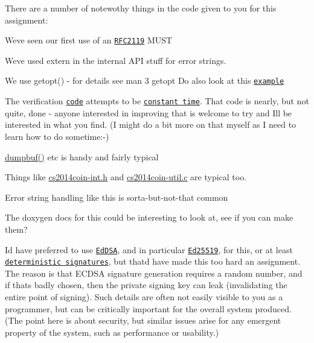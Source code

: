 There are a number of notewothy things in the code given to you for this assignment\+:


\begin{DoxyItemize}
\item We\textquotesingle{}ve seen our first use of an \href{https://tools.ietf.org/html/rfc2119}{\tt R\+F\+C2119} M\+U\+ST
\item We\textquotesingle{}ve used {\ttfamily extern} in the internal A\+PI stuff for error strings.
\item We use {\ttfamily getopt()} -\/ for details see {\ttfamily man 3 getopt} Do also look at this \href{https://www.gnu.org/software/libc/manual/html_node/Example-of-Getopt.html}{\tt example}
\item The verification \href{./cs2014coin-check.c}{\tt code} attempts to be \href{https://cryptocoding.net/index.php/Coding_rules}{\tt constant time}. That code is nearly, but not quite, done -\/ anyone interested in improving that is welcome to try and I\textquotesingle{}ll be interested in what you find. (I might do a bit more on that myself as I need to learn how to do sometime\+:-\/)
\item {\ttfamily \hyperlink{cs2014coin-int_8h_afd151090a1b9f8e9a800daa05be4bbf6}{dumpbuf()}} etc is handy and fairly typical
\item Things like {\ttfamily \hyperlink{cs2014coin-int_8h}{cs2014coin-\/int.\+h}} and {\ttfamily \hyperlink{cs2014coin-util_8c}{cs2014coin-\/util.\+c}} are typical too.
\item Error string handling like this is sorta-\/but-\/not-\/that common
\item The doxygen docs for this could be interesting to look at, see if you can make them?
\item I\textquotesingle{}d have preferred to use \href{https://en.wikipedia.org/wiki/EdDSA}{\tt Ed\+D\+SA}, and in particular \href{https://tools.ietf.org/html/rfc8032}{\tt Ed25519}, for this, or at least \href{https://tools.ietf.org/html/rfc6979}{\tt deterministic signatures}, but that\textquotesingle{}d have made this too hard an assignment. The reason is that E\+C\+D\+SA signature generation requires a random number, and if that\textquotesingle{}s badly chosen, then the private signing key can leak (invalidating the entire point of signing). Such details are often not easily visible to you as a programmer, but can be critically important for the overall system produced. (The point here is about security, but similar issues arise for any emergent property of the system, such as performance or usability.)
\end{DoxyItemize}

